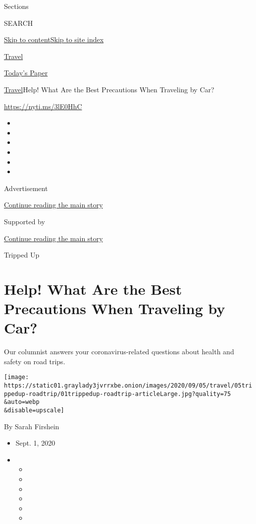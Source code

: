 Sections

SEARCH

\protect\hyperlink{site-content}{Skip to
content}\protect\hyperlink{site-index}{Skip to site index}

\href{https://www.nytimes3xbfgragh.onion/section/travel}{Travel}

\href{https://myaccount.nytimes3xbfgragh.onion/auth/login?response_type=cookie\&client_id=vi}{}

\href{https://www.nytimes3xbfgragh.onion/section/todayspaper}{Today's
Paper}

\href{/section/travel}{Travel}\textbar{}Help! What Are the Best
Precautions When Traveling by Car?

\url{https://nyti.ms/3lE0HhC}

\begin{itemize}
\item
\item
\item
\item
\item
\item
\end{itemize}

Advertisement

\protect\hyperlink{after-top}{Continue reading the main story}

Supported by

\protect\hyperlink{after-sponsor}{Continue reading the main story}

Tripped Up

\hypertarget{help-what-are-the-best-precautions-when-traveling-by-car}{%
\section{Help! What Are the Best Precautions When Traveling by
Car?}\label{help-what-are-the-best-precautions-when-traveling-by-car}}

Our columnist answers your coronavirus-related questions about health
and safety on road trips.

\texttt{[image: https://static01.graylady3jvrrxbe.onion/images/2020/09/05/travel/05trippedup-roadtrip/01trippedup-roadtrip-articleLarge.jpg?quality=75\\\&auto=webp\\\&disable=upscale]}

By Sarah Firshein

\begin{itemize}
\item
  Sept. 1, 2020
\item
  \begin{itemize}
  \item
  \item
  \item
  \item
  \item
  \item
  \end{itemize}
\end{itemize}

